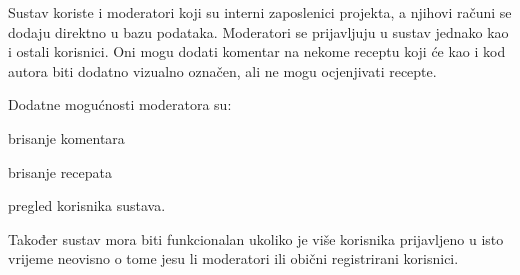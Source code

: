Sustav koriste i moderatori koji su interni zaposlenici projekta, a njihovi računi se dodaju direktno u bazu podataka. Moderatori se prijavljuju u sustav jednako kao i ostali korisnici. Oni mogu dodati komentar na nekome receptu koji će kao i kod autora  biti dodatno vizualno označen, ali ne mogu ocjenjivati recepte.
\newline

Dodatne mogućnosti moderatora su:

\begin{packed_item}
	\item brisanje komentara
	\item brisanje recepata
	\item pregled korisnika sustava.
\end{packed_item}
Također sustav mora biti funkcionalan ukoliko je više korisnika prijavljeno u isto vrijeme neovisno o tome jesu li moderatori ili obični registrirani korisnici.


\eject



